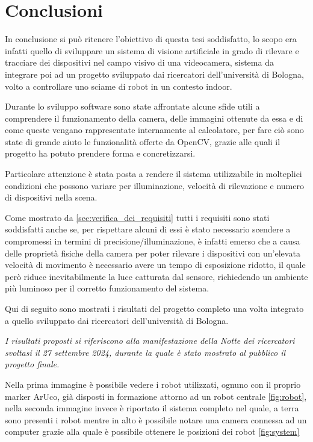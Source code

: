 \documentclass[12pt,a4paper,openright,twoside]{book}
\begin{document}
\chapter{Conclusioni}
In conclusione si può ritenere l'obiettivo di questa tesi soddisfatto, lo scopo era infatti quello di sviluppare un sistema di visione artificiale in grado di rilevare e tracciare dei dispositivi nel campo visivo di una videocamera, sistema da integrare poi ad un progetto sviluppato dai ricercatori dell'università di Bologna, volto a controllare uno sciame di robot in un contesto indoor.

Durante lo sviluppo software sono state affrontate alcune sfide utili a comprendere il funzionamento della camera, delle immagini ottenute da essa e di come queste vengano rappresentate internamente al calcolatore, per fare ciò sono state di grande aiuto le funzionalità offerte da OpenCV, grazie alle quali il progetto ha potuto prendere forma e concretizzarsi.

Particolare attenzione è stata posta a rendere il sistema utilizzabile in molteplici condizioni che possono variare per illuminazione, velocità di rilevazione e numero di dispositivi nella scena.

Come mostrato da \ref{sec:verifica_dei_requisiti} tutti i requisiti sono stati soddisfatti anche se, per rispettare alcuni di essi è stato necessario scendere a compromessi in termini di precisione/illuminazione, è infatti emerso che a causa delle proprietà fisiche della camera per poter rilevare i dispositivi con un'elevata velocità di movimento è necessario avere un tempo di esposizione ridotto, il quale però riduce inevitabilmente la luce catturata dal sensore, richiedendo un ambiente più luminoso per il corretto funzionamento del sistema.

Qui di seguito sono mostrati i risultati del progetto completo una volta integrato a quello sviluppato dai ricercatori dell'università di Bologna.

\vspace{0.5cm}
\textit{I risultati proposti si riferiscono alla manifestazione della Notte dei ricercatori svoltasi il 27 settembre 2024, durante la quale è stato mostrato al pubblico il progetto finale.}
\vspace{0.5cm}

Nella prima immagine è possibile vedere i robot utilizzati, ognuno con il proprio marker ArUco, già disposti in formazione attorno ad un robot centrale \ref{fig:robot}, nella seconda immagine invece è riportato il sistema completo nel quale, a terra sono presenti i robot mentre in alto è possibile notare una camera connessa ad un computer grazie alla quale è possibile ottenere le posizioni dei robot \ref{fig:system}
\end{document}
